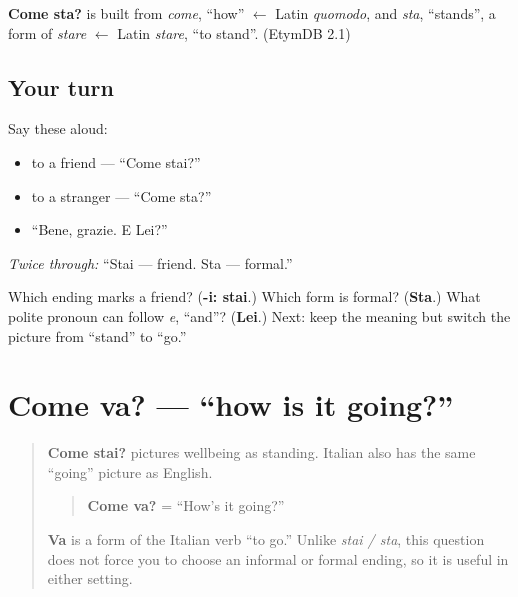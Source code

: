 \begin{cousinweb}
\textbf{Come sta?} is built from \emph{come}, \textquotedblleft{}how\textquotedblright{} $\leftarrow$ Latin \emph{quomodo}, and \emph{sta}, \textquotedblleft{}stands\textquotedblright{}, a form of \emph{stare} $\leftarrow$ Latin \emph{stare}, \textquotedblleft{}to stand\textquotedblright{}. (EtymDB 2.1)
\end{cousinweb}

\subsection*{Your turn}
Say these aloud:

\begin{itemize}
\raggedright
  \item to a friend — “Come stai?”
  \item to a stranger — “Come sta?”
  \item “Bene, grazie. E Lei?”
\end{itemize}

\emph{Twice through:} “Stai — friend. Sta — formal.”

\begin{tcolorbox}[breakable,colback=teal!4,colframe=teal!35!black,title={Before you move on}]
Which ending marks a friend? (\textbf{-i: stai}.) Which form is formal? (\textbf{Sta}.) What polite pronoun can follow \emph{e}, “and”? (\textbf{Lei}.) Next: keep the meaning but switch the picture from “stand” to “go.”
\end{tcolorbox}
\section[Come va?]{Come va? — “how is it going?”}

\label{lesson:IT-C02-come-va}



\begin{quote}
\textbf{Come stai?} pictures wellbeing as standing. Italian also has the same “going” picture as English.

\begin{quote}
\textbf{Come va?} = “How’s it going?”
\end{quote}

\textbf{Va} is a form of the Italian verb “to go.” Unlike \emph{stai / sta}, this question does not force you to choose an informal or formal ending, so it is useful in either setting.
\end{quote}

